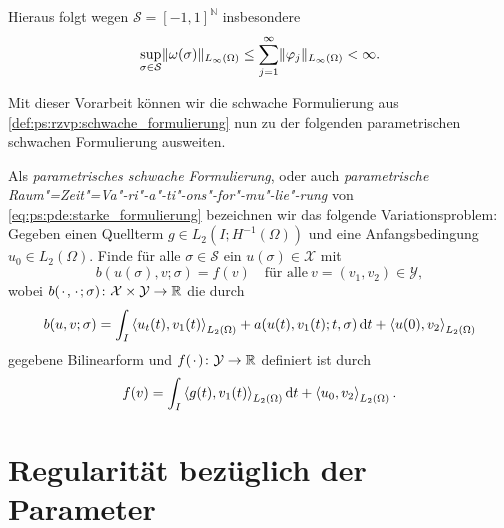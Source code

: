 Hieraus folgt wegen $\mathcal S = [-1, 1]^{\mathbb{N}}$ insbesondere
\begin{equation}
\label{eq:ps:pf:omega_norm_abschaetzung}
    \sup_{\sigma \in \mathcal S} \lVert\omega(\sigma)\rVert_{L_{\infty}(\Omega)} \leq \sum_{j = 1}^{\infty} \lVert\varphi_{j}\rVert_{L_{\infty}(\Omega)} < \infty.
\end{equation}

Mit dieser Vorarbeit können wir die schwache Formulierung aus \cref{def:ps:rzvp:schwache_formulierung} nun zu der folgenden parametrischen schwachen Formulierung ausweiten.


\begin{Definition}
\label{def:ps:pf:schwache_formulierung}
    Als \emph{parametrisches schwache Formulierung}, oder auch \emph{parametrische Raum"=Zeit"=Va"-ri"-a"-ti"-ons"-for"-mu"-lie"-rung} von \cref{eq:ps:pde:starke_formulierung} bezeichnen wir das folgende Variationsproblem:
    Gegeben einen Quellterm $g \in L_{2}(I; H^{-1}(\Omega))$ und eine Anfangsbedingung $u_{0} \in L_{2}(\Omega)$.
    Finde für alle $\sigma \in \mathcal S$ ein $u(\sigma) \in \mathcal X$ mit
    \begin{equation}
        \label{eq:ps:pf:schwache_formulierung}
        b(u(\sigma), v; \sigma) = f(v) \quad \text{für alle}~v = (v_{1}, v_{2}) \in \mathcal Y,
    \end{equation}
    wobei $b({\mkern2mu\cdot\mkern2mu}, {\mkern2mu\cdot\mkern2mu}; \sigma) \colon \mathcal X \times \mathcal Y \to \mathbb{R}$ die durch
    \begin{equation}
        \label{eq:ps:pf:schwache_formulierung_lhs_b}
        b(u, v; \sigma)
            = \int_{I} \left\langle u_{t}(t),v_{1}(t)\right\rangle_{L_{2}(\Omega)} + a(u(t), v_{1}(t); t, \sigma) \mathop{}\!\mathrm{d} t + \left\langle u(0),v_{2}\right\rangle_{L_{2}(\Omega)}
    \end{equation}
    gegebene Bilinearform und $f({\mkern2mu\cdot\mkern2mu}) \colon \mathcal Y \to \mathbb{R}$ definiert ist durch
    \begin{equation}
        \label{eq:ps:pf:schwache_formulierung_rhs_f}
        f(v) = \int_{I} \left\langle g(t),v_{1}(t)\right\rangle_{L_{2}(\Omega)} \mathop{}\!\mathrm{d} t + \left\langle u_{0},v_{2}\right\rangle_{L_{2}(\Omega)}.
    \end{equation}
\end{Definition}



\section{Regularität bezüglich der Parameter} %
\label{sec:ps:rg:regularitaet_bezueglich_der_parameter}

